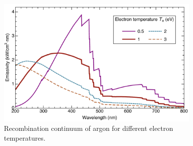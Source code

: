 \begin{figure}[ht!]
\centering
\includegraphics[width=100mm]{figures/ap6/recombination/continuum.pdf}
\caption{Recombination continuum of argon for different electron temperatures.}
\label{fig:recomContinuum}
\end{figure}

